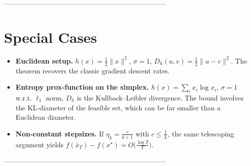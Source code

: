 \documentclass{article}
\begin{document}
-----------------------------------------------------------------------

\section*{Special Cases}
\begin{itemize}
\item \textbf{Euclidean setup.} $h(x)=\frac12\|x\|^{2}$, $\sigma=1$, $D_h(u,v)=\frac12\|u-v\|^{2}$. The theorem recovers the classic gradient descent rates.
\item \textbf{Entropy prox‑function on the simplex.} $h(x)=\sum_{i}x_i\log x_i$, $\sigma=1$ w.r.t. $\ell_{1}$ norm, $D_h$ is the Kullback–Leibler divergence. The bound involves the KL‑diameter of the feasible set, which can be far smaller than a Euclidean diameter.
\item \textbf{Non‑constant stepsizes.} If $\eta_k=\frac{c}{k+1}$ with $c\le \frac{1}{L}$, the same telescoping argument yields $f(\bar x_T)-f(x^{\star})=O\big(\frac{\log T}{T}\big)$.
\end{itemize}

-----------------------------------------------------------------------
\end{document}
